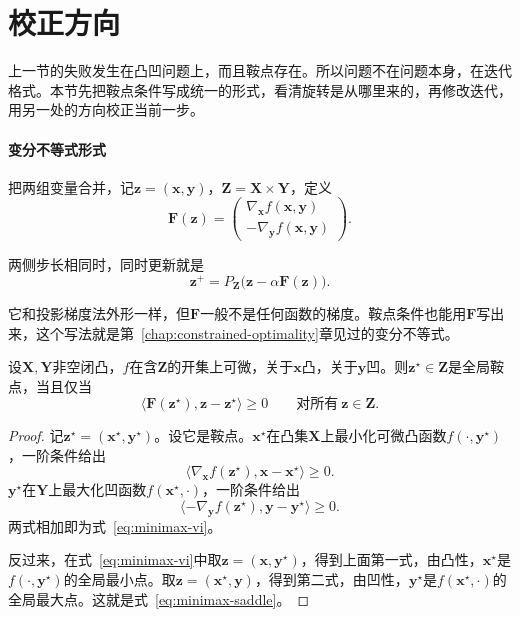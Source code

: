 \section{校正方向}
\label{sec:minimax-correction}

上一节的失败发生在凸凹问题上，而且鞍点存在。所以问题不在问题本身，在迭代格式。本节先把鞍点条件写成统一的形式，看清旋转是从哪里来的，再修改迭代，用另一处的方向校正当前一步。

\paragraph{变分不等式形式}
把两组变量合并，记$\bm{z}=(\bm{x},\bm{y})$，$\bm{Z}=\bm{X}\times\bm{Y}$，定义
\begin{equation}
 \bm{F}(\bm{z})=\begin{pmatrix}\nabla_{\bm{x}}f(\bm{x},\bm{y})\\-\nabla_{\bm{y}}f(\bm{x},\bm{y})\end{pmatrix}.
 \label{eq:minimax-operator}
\end{equation}

两侧步长相同时，同时更新就是
\[
 \bm{z}^{+}=P_{\bm{Z}}\bigl(\bm{z}-\alpha\bm{F}(\bm{z})\bigr).
\]

它和投影梯度法外形一样，但$\bm{F}$一般不是任何函数的梯度。鞍点条件也能用$\bm{F}$写出来，这个写法就是第~\ref{chap:constrained-optimality}章见过的变分不等式。

\begin{theorem}[鞍点的变分不等式刻画]
\label{thm:minimax-vi}
设$\bm{X},\bm{Y}$非空闭凸，$f$在含$\bm{Z}$的开集上可微，关于$\bm{x}$凸，关于$\bm{y}$凹。则$\bm{z}^\star\in\bm{Z}$是全局鞍点，当且仅当
\begin{equation}
 \langle\bm{F}(\bm{z}^\star),\bm{z}-\bm{z}^\star\rangle\geq0\qquad\text{对所有}\ \bm{z}\in\bm{Z}.
 \label{eq:minimax-vi}
\end{equation}
\end{theorem}

\begin{proof}
记$\bm{z}^\star=(\bm{x}^\star,\bm{y}^\star)$。设它是鞍点。$\bm{x}^\star$在凸集$\bm{X}$上最小化可微凸函数$f(\cdot,\bm{y}^\star)$，一阶条件给出
\[
 \langle\nabla_{\bm{x}}f(\bm{z}^\star),\bm{x}-\bm{x}^\star\rangle\geq0.
\]
$\bm{y}^\star$在$\bm{Y}$上最大化凹函数$f(\bm{x}^\star,\cdot)$，一阶条件给出
\[
 \langle-\nabla_{\bm{y}}f(\bm{z}^\star),\bm{y}-\bm{y}^\star\rangle\geq0.
\]
两式相加即为式~\eqref{eq:minimax-vi}。

反过来，在式~\eqref{eq:minimax-vi}中取$\bm{z}=(\bm{x},\bm{y}^\star)$，得到上面第一式，由凸性，$\bm{x}^\star$是$f(\cdot,\bm{y}^\star)$的全局最小点。取$\bm{z}=(\bm{x}^\star,\bm{y})$，得到第二式，由凹性，$\bm{y}^\star$是$f(\bm{x}^\star,\cdot)$的全局最大点。这就是式~\eqref{eq:minimax-saddle}。
\end{proof}

